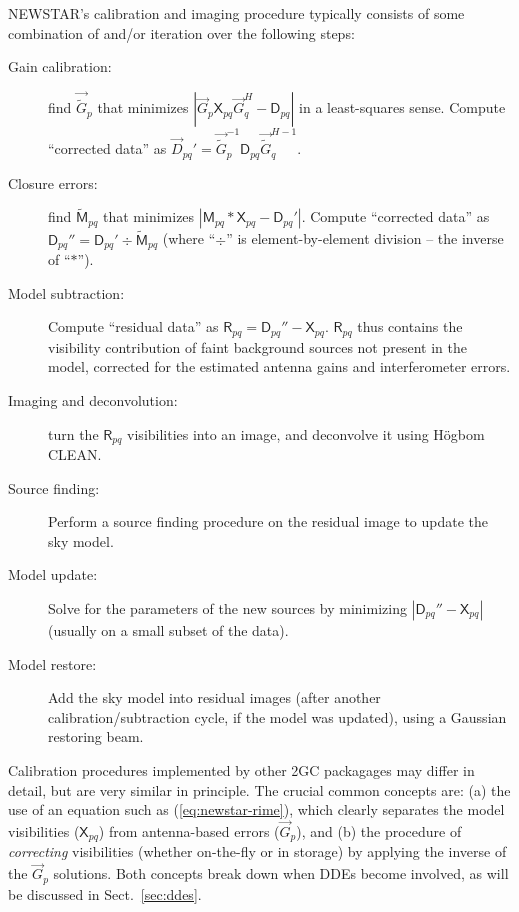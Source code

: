 \documentclass{aa}
\newcommand{\herm}{H}
\newcommand{\jones}[2]{\vec {#1}_{#2}}
\newcommand{\jonesinv}[2]{\vec {#1}^{-1}_{#2}}
\newcommand{\jonesT}[2]{\vec {#1}^{\herm}_{#2}}
\newcommand{\jonesTinv}[2]{\vec {#1}^{{\herm}-1}_{#2}}
\newcommand{\coh}[2]{\mathsf{{#1}}_{{#2}}}
\begin{document}
NEWSTAR's calibration and imaging procedure typically consists of some combination of and/or iteration over the following steps:

\begin{description}

\item[Gain calibration:] find $\jones{\tilde{G}}{p}$ that minimizes $|\jones{G}{p}\coh{X}{pq}\jonesT{G}{q} - \coh{D}{pq}|$ in a least-squares sense. Compute ``corrected data'' as $\jones{D}{pq}' = \jonesinv{\tilde{G}}{p} \coh{D}{pq} \jonesTinv{\tilde{G}}{q}.$

\item[Closure errors:] find $\coh{\tilde{M}}{pq}$ that minimizes $|\coh{M}{pq} \ast \coh{X}{pq} - \coh{D}{pq}'|$.
Compute ``corrected data'' as $\coh{D}{pq}'' = \coh{D}{pq}' \div \coh{\tilde{M}}{pq}$ (where ``$\div$'' is element-by-element division -- the inverse of ``$\ast$'').

\item[Model subtraction:] Compute ``residual data'' as $\coh{R}{pq} = \coh{D}{pq}'' - \coh{X}{pq}$. $\coh{R}{pq}$ thus contains the visibility contribution of faint background sources not present in the model, corrected for the estimated antenna gains and interferometer errors.

\item[Imaging and deconvolution:] turn the $\coh{R}{pq}$ visibilities into an image, and deconvolve it using H\"ogbom CLEAN. 

\item[Source finding:] Perform a source finding procedure on the residual image to update the sky model.

\item[Model update:] Solve for the parameters of the new sources by minimizing $|\coh{D}{pq}'' - \coh{X}{pq}|$ (usually on a small subset of the data).

\item[Model restore:] Add the sky model into residual images (after another calibration/subtraction cycle, if the model was updated), using a Gaussian restoring beam.

\end{description}

Calibration procedures implemented by other 2GC packagages may differ in detail, but are very similar in principle. The crucial common concepts are: (a) the use of an equation such as (\ref{eq:newstar-rime}), which clearly separates the model visibilities ($\coh{X}{pq}$) from antenna-based errors ($\jones{G}{p}$), and (b) the procedure of \emph{correcting} visibilities (whether on-the-fly or in storage) by applying the inverse of the $\jones{G}{p}$ solutions. Both concepts break down when DDEs become involved, as will be discussed in Sect.~\ref{sec:ddes}.
\end{document}
